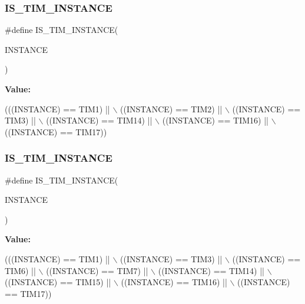 \subsubsection{\texorpdfstring{I\+S\+\_\+\+T\+I\+M\+\_\+\+I\+N\+S\+T\+A\+N\+CE}{IS\_TIM\_INSTANCE}\hspace{0.1cm}{\footnotesize\ttfamily [5/16]}}
{\footnotesize\ttfamily \#define I\+S\+\_\+\+T\+I\+M\+\_\+\+I\+N\+S\+T\+A\+N\+CE(\begin{DoxyParamCaption}\item[{}]{I\+N\+S\+T\+A\+N\+CE }\end{DoxyParamCaption})}

{\bfseries Value\+:}
\begin{DoxyCode}
(((INSTANCE) == TIM1)    || \(\backslash\)
   ((INSTANCE) == TIM2)    || \(\backslash\)
   ((INSTANCE) == TIM3)    || \(\backslash\)
   ((INSTANCE) == TIM14)   || \(\backslash\)
   ((INSTANCE) == TIM16)   || \(\backslash\)
   ((INSTANCE) == TIM17))
\end{DoxyCode}
\mbox{\label{group___exported__macro_gaba506eb03409b21388d7c5a6401a4f98}} 
\subsubsection{\texorpdfstring{I\+S\+\_\+\+T\+I\+M\+\_\+\+I\+N\+S\+T\+A\+N\+CE}{IS\_TIM\_INSTANCE}\hspace{0.1cm}{\footnotesize\ttfamily [6/16]}}
{\footnotesize\ttfamily \#define I\+S\+\_\+\+T\+I\+M\+\_\+\+I\+N\+S\+T\+A\+N\+CE(\begin{DoxyParamCaption}\item[{}]{I\+N\+S\+T\+A\+N\+CE }\end{DoxyParamCaption})}

{\bfseries Value\+:}
\begin{DoxyCode}
(((INSTANCE) == TIM1)    || \(\backslash\)
   ((INSTANCE) == TIM3)    || \(\backslash\)
   ((INSTANCE) == TIM6)    || \(\backslash\)
   ((INSTANCE) == TIM7)    || \(\backslash\)
   ((INSTANCE) == TIM14)   || \(\backslash\)
   ((INSTANCE) == TIM15)   || \(\backslash\)
   ((INSTANCE) == TIM16)   || \(\backslash\)
   ((INSTANCE) == TIM17))
\end{DoxyCode}
\mbox{\label{group___exported__macro_gaba506eb03409b21388d7c5a6401a4f98}} 
